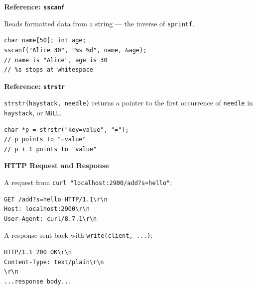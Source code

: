 \documentclass[oneside, landscape]{article}
\begin{document}
\begin{minipage}[t]{0.45\textwidth}

\textbf{Reference: \texttt{sscanf}}

\vspace{0.5em}

Reads formatted data from a string — the inverse of \texttt{sprintf}.

\begin{lstlisting}[numbers=none, basicstyle=\ttfamily\footnotesize]
char name[50]; int age;
sscanf("Alice 30", "%s %d", name, &age);
// name is "Alice", age is 30
// %s stops at whitespace
\end{lstlisting}

\vspace{0.5em}

\textbf{Reference: \texttt{strstr}}

\vspace{0.5em}

\texttt{strstr(haystack, needle)} returns a pointer to the first occurrence of \texttt{needle} in \texttt{haystack}, or \texttt{NULL}.

\begin{lstlisting}[numbers=none, basicstyle=\ttfamily\footnotesize]
char *p = strstr("key=value", "=");
// p points to "=value"
// p + 1 points to "value"
\end{lstlisting}

\end{minipage}
\hfill
\begin{minipage}[t]{0.50\textwidth}

\textbf{HTTP Request and Response}

\vspace{0.5em}

A request from \texttt{curl "localhost:2900/add?s=hello"}:

\begin{lstlisting}[numbers=none, basicstyle=\ttfamily\footnotesize]
GET /add?s=hello HTTP/1.1\r\n
Host: localhost:2900\r\n
User-Agent: curl/8.7.1\r\n
\end{lstlisting}

\vspace{0.5em}

A response sent back with \texttt{write(client, ...)}:

\begin{lstlisting}[numbers=none, basicstyle=\ttfamily\footnotesize]
HTTP/1.1 200 OK\r\n
Content-Type: text/plain\r\n
\r\n
...response body...
\end{lstlisting}

\end{minipage}
\end{document}
